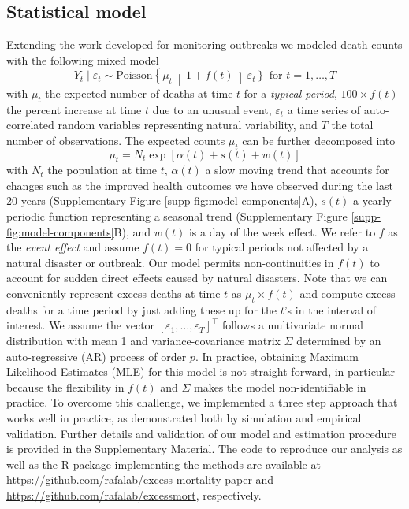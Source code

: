 \documentclass[11pt]{article}
\begin{document}
\subsection{Statistical model}
\label{subsec:statistical-model}
Extending the work developed for monitoring outbreaks \cite{farrington1996statistical,hohle2008count,noufaily2013improved,salmon2016monitoring} we modeled death counts with the following mixed model
\begin{equation}
    Y_t \mid \varepsilon_t \sim 
    \mbox{Poisson}\left\{ \mu_t \right[1 + f(t) \left]  \varepsilon_t \right\} \mbox{ for } t = 1, \dots,T
    \label{eq:mixed-model}
\end{equation}
with $\mu_t$ the expected number of deaths at time $t$ for a \emph{typical period}, $100 \times f(t)$ the percent increase at time $t$ due to an unusual event, $\varepsilon_t$ a time series of auto-correlated random variables representing natural variability, and $T$ the total number of observations. The expected counts $\mu_t$ can be further decomposed into 
\begin{equation}
    \mu_t =N_t \exp[\alpha(t) + s(t) + w(t)]
    \label{eq:mean-model}
\end{equation}
with $N_t$ the population at time $t$, $\alpha(t)$ a slow moving trend that accounts for changes such as the improved health outcomes we have observed during the last 20 years (Supplementary Figure \ref{supp-fig:model-components}A), $s(t)$ a yearly periodic function representing a seasonal trend (Supplementary Figure \ref{supp-fig:model-components}B), and $w(t)$ is a day of the week effect. We refer to $f$ as the \emph{event effect} and assume $f(t) = 0$ for typical periods not affected by a natural disaster or outbreak. Our model permits non-continuities in $f(t)$ to account for sudden direct effects caused by natural disasters. Note that we can conveniently represent excess deaths at time $t$ as $\mu_t \times f(t)$ and compute excess deaths for a time period by just adding these up for the $t$'s in the interval of interest. We assume the vector $[\varepsilon_1, \ldots, \varepsilon_T]^\top$ follows a multivariate normal distribution with mean 1 and variance-covariance matrix $\Sigma$ determined by an auto-regressive (AR) process of order $p$. In practice, obtaining Maximum Likelihood Estimates (MLE) for this model is not straight-forward, in particular because the flexibility in $f(t)$ and $\Sigma$ makes the model non-identifiable in practice. To overcome this challenge, we implemented a three step approach that works well in practice, as demonstrated both by simulation and empirical validation. Further details and validation of our model and estimation procedure is provided in the Supplementary Material. The code to reproduce our analysis as well as the R package implementing the methods are available at 
\url{https://github.com/rafalab/excess-mortality-paper} and  \url{https://github.com/rafalab/excessmort}, respectively.
\end{document}
